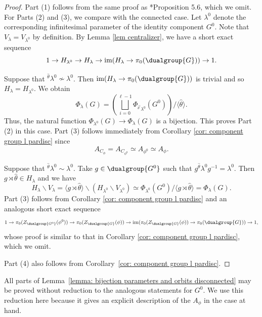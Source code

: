 \documentclass[11pt,letterpaper]{amsart}
\numberwithin{equation}{section}
\begin{document}
\begin{proof}
Part (1) follows from the same proof as \cite{CFMMX22}*{Proposition 5.6}, which we omit. For Parts (2) and (3), we compare with the connected case. Let $\lambda^{0}$ denote the corresponding infinitesimal parameter of the identity component $G^0$. Note that $V_{\lambda}= V_{\lambda^0}$ by definition. By Lemma \ref{lem centralizer}, we have a short exact sequence
\[ 1 \to H_{\lambda^0} \to H_{\lambda} \to \textrm{im}(H_{\lambda}  \to \pi_0(\dualgroup{G})) \to 1.\]

Suppose that ${}^{\hat{\theta}}\lambda^0 \not\sim \lambda^0$. Then $\textrm{im}(H_{\lambda}  \to \pi_0(\dualgroup{G}))$ is trivial and so
$H_{\lambda}=H_{\lambda^0}$. We obtain 
\[ \Phi_{\lambda}(G)= \left(\bigsqcup_{i=0}^{\ell-1} \Phi_{{}^{\hat{\theta}^i} \lambda^0} (G^0)\right)/ \langle \hat{\theta} \rangle. \]
Thus, the natural function $\Phi_{\lambda^0}(G) \to \Phi_{\lambda}(G)$ is a bijection. This proves Part (2) in this case. Part (3) follows immediately from Corollary \ref{cor: component group  l pardisc} since 
\[ A_{C_{\phi}}= A_{C_{\phi^0}} \simeq A_{\phi^0} \simeq A_{\phi}.\]

Suppose that ${}^{\hat{\theta}}\lambda^0 \sim \lambda^0$. Take $g \in \dualgroup{G^0}$ such that $ g {}^{\hat{\theta}} \lambda^0 g^{-1}=  \lambda^0$. Then $g \rtimes \hat{\theta} \in H_{\lambda}$ and we have
\[H_{\lambda} \backslash V_{\lambda}= \langle g \rtimes \hat{\theta}\rangle \backslash (H_{\lambda^0} \backslash V_{\lambda^0}) \simeq \Phi_{\lambda^0}(G^0)/ \langle  g \rtimes \hat{\theta}\rangle = \Phi_{\lambda}(G). \]
Part (3) follows from Corollary \ref{cor: component group  l pardisc}  and an analogous short exact sequence 
\[ 1 \to \pi_0(Z_{\dualgroup{G^0}}(\phi^0)) \to \pi_0(Z_{\dualgroup{G}}(\phi)) \to \textrm{im}(\pi_0(Z_{\dualgroup{G}}(\phi)) \to \pi_0(\dualgroup{G})) \to 1,\]
whose proof is similar to that in Corollary \ref{cor: component group  l pardisc}, which we omit.

Part (4) also follows from Corollary~\ref{cor: component group  l pardisc}.
\end{proof}

\begin{remark}
All parts of Lemma~\ref{lemma: bijection parameters and orbits disconnected} may be proved without reduction to the analogous statements for $G^0$. 
We use this reduction here because it gives an explicit description of the $A_\phi$ in the case at hand.
\end{remark}
\end{document}
